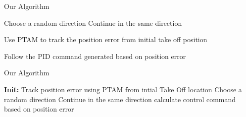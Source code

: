 \documentclass{article}
\begin{document}
\begin{algorithm}
\caption{Our Algorithm}\label{euclid}
\begin{algorithmic}[1]
    \State Choose a random direction
        \State Continue in the same direction
    \EndWhile
    
    \State Use PTAM to track the position error from initial take off position
    
        \State Follow the PID command generated based on position error
    \EndWhile
\EndWhile

\end{algorithmic}
\end{algorithm}

\begin{algorithm}
\caption{Our Algorithm}\label{euclid}
\begin{algorithmic}[1]
\State \textbf{Init:} Track position error using PTAM from intial Take Off location
    \State Choose a random direction
        \State Continue in the same direction
    \EndWhile
        \State calculate control command based on position error
    \EndWhile
\EndWhile

\end{algorithmic}
\end{algorithm}
\end{document}
